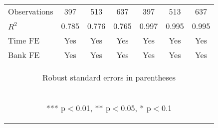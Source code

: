 \documentclass[]{article}
\begin{document}
\begin{center}
\begin{tabular}{lcccccc}
Observations & 397 & 513 & 637 & 397 & 513 & 637 \\
$R^2$ & 0.785 & 0.776 & 0.765 & 0.997 & 0.995 & 0.995 \\
Time FE & Yes & Yes & Yes & Yes & Yes & Yes \\
 Bank FE & Yes & Yes & Yes & Yes & Yes & Yes \\ \hline
\multicolumn{7}{c}{\begin{footnotesize} Robust standard errors in parentheses\end{footnotesize}} \\
\multicolumn{7}{c}{\begin{footnotesize} *** p$<$0.01, ** p$<$0.05, * p$<$0.1\end{footnotesize}} \\
\end{tabular}
\end{center}
\end{document}
